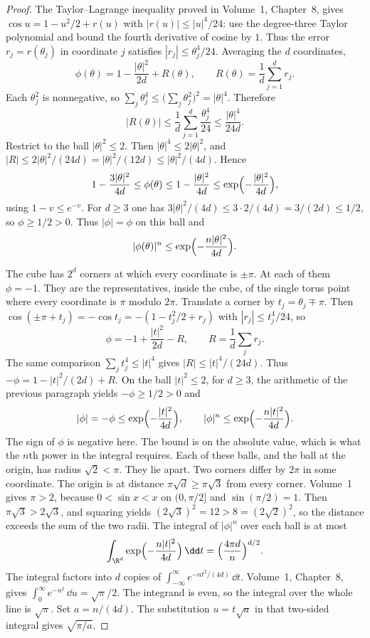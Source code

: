 \begin{proof}
The Taylor--Lagrange inequality proved in Volume~1, Chapter~8, gives $\cos u=1-u^2/2+r(u)$ with $|r(u)|\le |u|^4/24$: use the degree-three Taylor polynomial and bound the fourth derivative of cosine by $1$. Thus the error $r_j=r(\theta_j)$ in coordinate $j$ satisfies $|r_j|\le\theta_j^4/24$. Averaging the $d$ coordinates,
\[
 \phi(\theta)=1-\frac{|\theta|^2}{2d}+R(\theta),\qquad R(\theta)=\frac1d\sum_{j=1}^d r_j.
\]
Each $\theta_j^2$ is nonnegative, so $\sum_j\theta_j^4\le\bigl(\sum_j\theta_j^2\bigr)^2=|\theta|^4$. Therefore
\[
 |R(\theta)|\le\frac1d\sum_{j=1}^d\frac{\theta_j^4}{24}\le\frac{|\theta|^4}{24d}.
\]
Restrict to the ball $|\theta|^2\le2$. Then $|\theta|^4\le2|\theta|^2$, and $|R|\le2|\theta|^2/(24d)=|\theta|^2/(12d)\le|\theta|^2/(4d)$. Hence
\[
 1-\frac{3|\theta|^2}{4d}\le\phi(\theta)\le 1-\frac{|\theta|^2}{4d}\le\exp\Bigl(-\frac{|\theta|^2}{4d}\Bigr),
\]
using $1-v\le e^{-v}$. For $d\ge3$ one has $3|\theta|^2/(4d)\le3\cdot2/(4d)=3/(2d)\le1/2$, so $\phi\ge1/2>0$. Thus $|\phi|=\phi$ on this ball and
\[
 |\phi(\theta)|^n\le\exp\Bigl(-\frac{n|\theta|^2}{4d}\Bigr).
\]

The cube has $2^d$ corners at which every coordinate is $\pm\pi$. At each of them $\phi=-1$. They are the representatives, inside the cube, of the single torus point where every coordinate is $\pi$ modulo $2\pi$. Translate a corner by $t_j=\theta_j\mp\pi$. Then $\cos(\pm\pi+t_j)=-\cos t_j=-(1-t_j^2/2+r_j)$ with $|r_j|\le t_j^4/24$, so
\[
 \phi=-1+\frac{|t|^2}{2d}-R,\qquad R=\frac1d\sum_j r_j.
\]
The same comparison $\sum_j t_j^4\le|t|^4$ gives $|R|\le|t|^4/(24d)$. Thus $-\phi=1-|t|^2/(2d)+R$. On the ball $|t|^2\le2$, for $d\ge3$, the arithmetic of the previous paragraph yields $-\phi\ge1/2>0$ and
\[
 |\phi|=-\phi\le\exp\Bigl(-\frac{|t|^2}{4d}\Bigr),\qquad
 |\phi|^n\le\exp\Bigl(-\frac{n|t|^2}{4d}\Bigr).
\]
The sign of $\phi$ is negative here. The bound is on the absolute value, which is what the $n$th power in the integral requires. Each of these balls, and the ball at the origin, has radius $\sqrt2<\pi$. They lie apart. Two corners differ by $2\pi$ in some coordinate. The origin is at distance $\pi\sqrt d\ge\pi\sqrt3$ from every corner. Volume~1 gives $\pi>2$, because $0<\sin x<x$ on $(0,\pi/2]$ and $\sin(\pi/2)=1$. Then $\pi\sqrt3>2\sqrt3$, and squaring yields $(2\sqrt3)^2=12>8=(2\sqrt2)^2$, so the distance exceeds the sum of the two radii. The integral of $|\phi|^n$ over each ball is at most
\[
 \int_{\R^d}\exp\Bigl(-\frac{n|t|^2}{4d}\Bigr)\,\dd t
 =\Bigl(\frac{4\pi d}{n}\Bigr)^{d/2}.
\]
The integral factors into $d$ copies of $\int_{-\infty}^{\infty}e^{-n t^2/(4d)}\,\dd t$. Volume~1, Chapter~8, gives $\int_0^{\infty}e^{-u^2}\,\dd u=\sqrt{\pi}/2$. The integrand is even, so the integral over the whole line is $\sqrt\pi$. Set $a=n/(4d)$. The substitution $u=t\sqrt a$ in that two-sided integral gives $\sqrt{\pi/a}$.


\end{proof}
